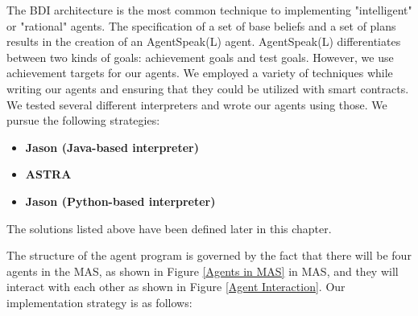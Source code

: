 \vspace{.5cm}

The \ac{BDI} architecture is the most common technique to implementing "intelligent" or "rational" agents. The specification of a set of base beliefs and a set of plans results in the creation of an AgentSpeak(L) agent. AgentSpeak(L) differentiates between two kinds of goals: achievement goals and test goals. However, we use achievement targets for our agents. We employed a variety of techniques while writing our agents and ensuring that they could be utilized with smart contracts. We tested several different interpreters and wrote our agents using those. We pursue the following strategies:
 
\begin{itemize}
    \item \textbf{Jason (Java-based interpreter)}
    
    \item \textbf{ASTRA}
    
    \item \textbf{Jason (Python-based interpreter)}

\end{itemize}

The solutions listed above have been defined later in this chapter.

\vspace{.5cm }

The structure of the agent program is governed by the fact that there will be four agents in the \ac{MAS}, as shown in Figure \ref{Agents in MAS} in MAS, and they will interact with each other as shown in Figure \ref{Agent Interaction}. Our implementation strategy is as follows:

